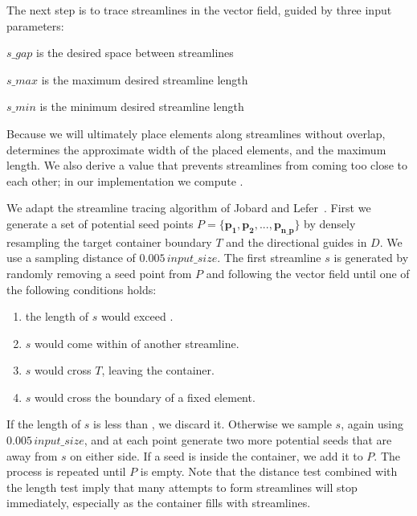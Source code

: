 \newtext
{
The next step is to trace streamlines in the vector field, guided by three input parameters:
\begin{packeddescriptions}
\item[$s\_gap$] is the desired space between streamlines 
\item[$s\_max$] is the maximum desired streamline length 
\item[$s\_min$] is the minimum desired streamline length   
\end{packeddescriptions}
Because we will ultimately place elements along streamlines without overlap,  determines
the approximate width of the placed elements, and  the maximum length.  We also derive
a value  that prevents streamlines from coming too close to each other; in our implementation we
compute .
}

We adapt the streamline tracing algorithm of Jobard and Lefer~\cite{Jobard1997}.
First we generate a set of potential seed points $P = \{ \bm{p_{1}}, \bm{p_{2}}, ... , \bm{p_{n\text{\_}p}}\}$  by
densely resampling the target container boundary $T$ and the directional guides in $D$.
We use a sampling distance of $0.005\,input\_size$.
The first streamline $s$ is generated by randomly removing a seed point from $P$ and following
the vector field until one of the following conditions holds:

\begin{enumerate}
\item the length of $s$ would exceed .
\item $s$ would come within  of another streamline.
\item $s$ would cross $T$, leaving the container.
\item $s$ would cross the boundary of a fixed element.
\end{enumerate}


If the length of $s$ is less than , we discard it. Otherwise we sample 
$s$, again using $0.005\,input\_size$, and at each point generate two more
potential seeds that are  away from $s$ on either side. If a seed is
inside the container, we add it to $P$.  The process is repeated until $P$ is empty.
Note that the  distance test combined with the  length
test imply that many attempts to form streamlines will stop immediately,
especially as the container fills with streamlines.

